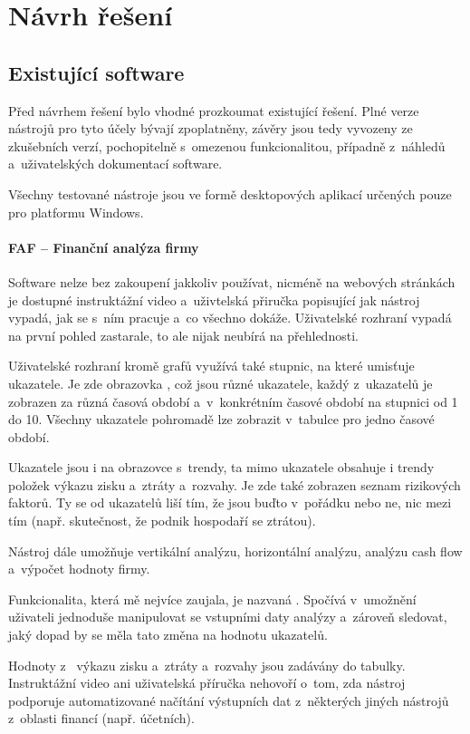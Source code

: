 \chapter{Návrh řešení}



\section{Existující software}
Před návrhem řešení bylo vhodné prozkoumat existující řešení. Plné verze nástrojů pro tyto účely bývají zpoplatněny, závěry jsou tedy vyvozeny ze zkušebních verzí, pochopitelně s~omezenou funkcionalitou, případně z~náhledů a~uživatelských dokumentací software.

Všechny testované nástroje jsou ve formě desktopových aplikací určených pouze pro platformu Windows.

\subsubsection{FAF -- Finanční analýza firmy}
Software nelze bez zakoupení jakkoliv používat, nicméně na webových stránkách je dostupné instruktážní video a~uživtelská přiručka popisující jak nástroj vypadá, jak se s~ním pracuje a~co všechno dokáže. Uživatelské rozhraní vypadá na první pohled zastarale, to ale nijak neubírá na přehlednosti.

Uživatelské rozhraní kromě grafů využívá také stupnic, na které umisťuje ukazatele. Je zde obrazovka , což jsou různé ukazatele, každý z~ukazatelů je zobrazen za různá časová období a~v~konkrétním časové období na stupnici od 1 do 10. Všechny ukazatele pohromadě lze zobrazit v~tabulce pro jedno časové období.

Ukazatele jsou i na obrazovce s~trendy, ta mimo ukazatele obsahuje i trendy položek výkazu zisku a~ztráty a~rozvahy. Je zde také zobrazen seznam rizikových faktorů. Ty se od ukazatelů liší tím, že jsou buďto v~pořádku nebo ne, nic mezi tím (např. skutečnost, že podnik hospodaří se ztrátou).

Nástroj dále umožňuje vertikální analýzu, horizontální analýzu, analýzu cash flow a~výpočet hodnoty firmy.

Funkcionalita, která mě nejvíce zaujala, je nazvaná . Spočívá v~umožnění uživateli jednoduše manipulovat se vstupními daty analýzy a~zároveň sledovat, jaký dopad by se měla tato změna na hodnotu ukazatelů.

Hodnoty z~ výkazu zisku a~ztráty a~rozvahy jsou zadávány do tabulky. Instruktážní video ani uživatelská příručka nehovoří o~tom, zda nástroj podporuje automatizované načítání výstupních dat z~některých jiných nástrojů z~oblasti financí (např. účetních).

